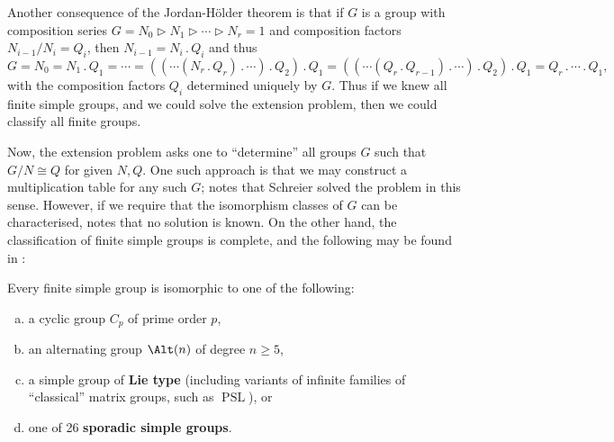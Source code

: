 Another consequence of the Jordan-H\"older theorem is that if $G$ is a group with composition series $G = N_0 \rhd N_1 \rhd \dotsb \rhd N_r = 1$ and composition factors $N_{i-1}/N_i = Q_i$, then $N_{i-1} = N_i \mathrel{.} Q_i$ and thus
$$G = N_0 = N_1 \mathrel{.} Q_1 = \dotsb = ((\dotsb(N_r \mathrel{.} Q_r)\mathrel{.}\dotsb )\mathrel{.} Q_2)\mathrel{.} Q_1 = ((\dotsb(Q_r \mathrel{.} Q_{r-1})\mathrel{.} \dotsb)\mathrel{.} Q_2)\mathrel{.} Q_1 = Q_r \mathrel{.} \dotsb \mathrel{.} Q_1,$$
with the composition factors $Q_i$ determined uniquely by $G$. Thus if we knew all finite simple groups, and we could solve the extension problem, then we could classify all finite groups.

Now, the extension problem asks one to ``determine'' all groups $G$ such that $G/N \cong Q$ for given $N,Q$. One such approach is that we may construct a multiplication table for any such $G$; \cite{rotman_intro_theory_groups1995} notes that Schreier solved the problem in this sense. However, if we require that the isomorphism classes of $G$ can be characterised, \cite{rotman_intro_theory_groups1995} notes that no solution is known. On the other hand, the classification of finite simple groups is complete, and the following may be found in \cite{solomon2018}:

\begin{theorem}\label{thm:cfsg}
    Every finite simple group is isomorphic to one of the following:
    \begin{enumerate}[(a)]
        \item a cyclic group $C_p$ of prime order $p$,
        \item an alternating group $\Alt(n)$ of degree $n \geq 5$,
        \item a simple group of \textbf{Lie type} (including variants of infinite families of ``classical'' matrix groups, such as $\operatorname{PSL}$), or
        \item one of 26 \textbf{sporadic simple groups}.
    \end{enumerate}
\end{theorem}


